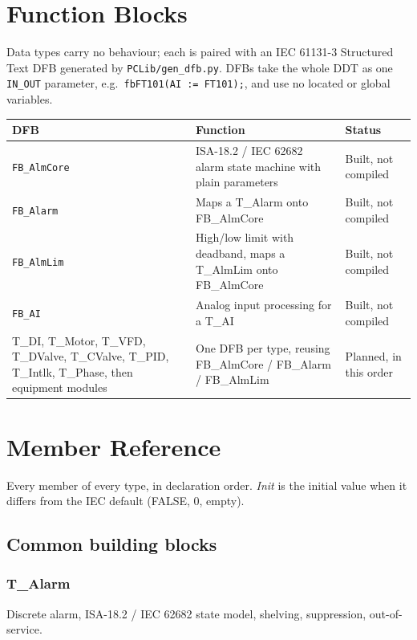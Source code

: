 \section{Function Blocks}
\label{app:pclib:dfb}
Data types carry no behaviour; each is paired with an IEC 61131-3 Structured Text DFB generated by \texttt{PCLib/gen\_dfb.py}. DFBs take the whole DDT as one \texttt{IN\_OUT} parameter, e.g.\ \texttt{fbFT101(AI := FT101);}, and use no located or global variables.
{\small
\begin{longtable}{@{}>{\raggedright\arraybackslash}p{4.6cm}>{\raggedright\arraybackslash}p{6.6cm}>{\raggedright\arraybackslash}p{3.2cm}@{}}
\toprule
\rowcolor{tblhead}\textbf{DFB} & \textbf{Function} & \textbf{Status} \\
\midrule
\endhead
\texttt{FB\_AlmCore} & ISA-18.2 /\allowbreak{} IEC 62682 alarm state machine with plain parameters & Built, not compiled \\
\texttt{FB\_Alarm} & Maps a T\_Alarm onto FB\_AlmCore & Built, not compiled \\
\texttt{FB\_AlmLim} & High/\allowbreak{}low limit with deadband, maps a T\_AlmLim onto FB\_AlmCore & Built, not compiled \\
\texttt{FB\_AI} & Analog input processing for a T\_AI & Built, not compiled \\
T\_DI, T\_Motor, T\_VFD, T\_DValve, T\_CValve, T\_PID, T\_Intlk, T\_Phase, then equipment modules & One DFB per type, reusing FB\_AlmCore /\allowbreak{} FB\_Alarm /\allowbreak{} FB\_AlmLim & Planned, in this order \\
\bottomrule
\end{longtable}
}

\section{Member Reference}
\label{app:pclib:members}
Every member of every type, in declaration order. \textit{Init} is the initial value when it differs from the IEC default (FALSE, 0, empty).
\subsection{Common building blocks}
\subsubsection*{T\_Alarm}
\label{app:pclib:talarm}
Discrete alarm, ISA-18.2 /\allowbreak{} IEC 62682 state model, shelving, suppression, out-of-service.

